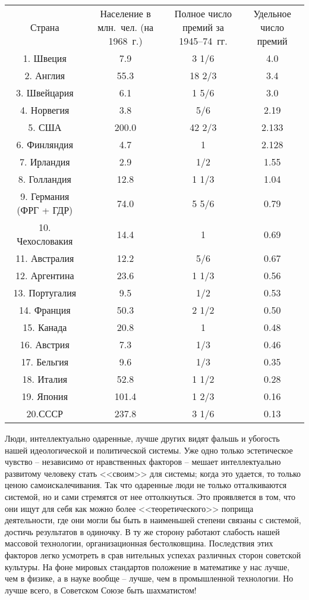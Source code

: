 \documentclass{book}
\begin{document}
\begin{tabular}{ c c c c }
Страна & Население в млн.~чел. (на 1968~г.) & Полное число премий за 1945--74~гг. & Удельное число премий \\
1. Швеция & 7.9 & 3 1/6 & 4.0  \\
2. Англия & 55.3 & 18 2/3 & 3.4 \\
3. Швейцария & 6.1 & 1 5/6 & 3.0 \\
4. Норвегия & 3.8 & 5/6 & 2.19 \\
5. США & 200.0 & 42 2/3 & 2.133 \\
6. Финляндия & 4.7 & 1 & 2.128 \\
7. Ирландия & 2.9 & 1/2 & 1.55 \\
8. Голландия & 12.8 & 1 1/3 & 1.04 \\
9. Германия (ФРГ + ГДР) & 74.0 & 5 5/6 & 0.79 \\
10. Чехословакия & 14.4 & 1 & 0.69 \\
11. Австралия & 12.2 & 5/6 & 0.67 \\
12. Аргентина & 23.6 & 1 1/3 & 0.56 \\
13. Португалия & 9.5 & 1/2 & 0.53 \\
14. Франция & 50.3 & 2 1/2 & 0.50 \\
15. Канада & 20.8 & 1 & 0.48 \\
16. Австрия & 7.3 & 1/3 & 0.46 \\
17. Бельгия & 9.6 & 1/3 & 0.35 \\
18. Италия & 52.8 & 1 1/2 & 0.28 \\
19. Япония & 101.4 & 1 2/3 & 0.16 \\
20.СССР & 237.8 & 3 1/6 & 0.13 \\
\end{tabular}

Люди, интеллектуально одаренные, лучше других видят фальшь и убогость нашей идеологической и политической системы. Уже одно 
только эстетическое чувство -- независимо от нравственных факторов -- мешает интеллектуально развитому человеку стать <<своим>> 
для системы; когда это удается, то только ценою самоискалечивания. Так что одаренные люди не только отталкиваются системой, но и 
сами стремятся от нее оттолкнуться. Это проявляется в том, что они ищут для себя как можно более <<теоретического>> поприща 
деятельности, где они могли бы быть в наименьшей степени связаны с систе­мой, достичь результатов в одиночку. В ту же сторону 
работают слабость нашей массовой технологии, организационная бестолковщина. Последствия этих факторов легко усмотреть в срав­
нительных успехах различных сторон советской культуры. На фоне мировых стандартов положение в математике у нас лучше, чем в 
физике, а в науке вообще -- лучше, чем в промыш­ленной технологии. Но лучше всего, в Советском Союзе быть шахматистом!
\end{document}
